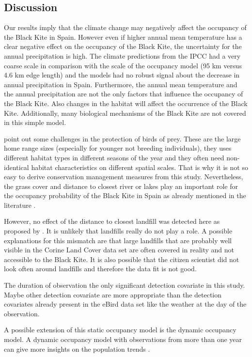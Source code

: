 \begin{multicols}{2}
\section{Discussion}
Our results imply that the climate change may negatively affect the occupancy of the Black Kite in Spain. However even if higher annual mean temperature has a clear negative effect on the occupancy of the Black Kite, the uncertainty for the annual precipitation is high. The climate predictions from the IPCC \parencite{ipcc} had a very coarse scale in comparison with the scale of the occupancy model (95 km versus 4.6 km edge length) and the models had no robust signal about the decrease in annual precipitation in Spain. Furthermore, the annual mean temperature and the annual precipitation are not the only factors that influence the occupancy of the Black Kite. Also changes in the habitat will affect the occurrence of the Black Kite. Additionally, many biological mechanisms of the Black Kite are not covered in this simple model.  

\textcite{Tanferna2013} point out some challenges in the protection of birds of prey. These are the large home range sizes (especially for younger not breeding individuals), they uses different habitat types in different seasons of the year and they often need non-identical habitat characteristics on different spatial scales. That is why it is not so easy to derive conservation management measures from this study. Nevertheless, the grass cover and distance to closest river or lakes play an important role for the occupancy probability of the Black Kite in Spain as already mentioned in the literature \parencite{Tanferna2013, Veiga1990}. 

However, no effect of the distance to closest landfill was detected here as proposed by \textcite{Blanco1997, Blanco1994}. It is unlikely that landfills really do not play a role. A possible explanations for this mismatch are that large landfills that are probably well visible in the Corine Land Cover data set \parencite{clc2018} are often covered in reality and not accessible to the Black Kite. It is also possible that the citizen scientist did not look often around landfills and therefore the data fit is not good. 

The duration of observation the only significant detection covariate in this study. Maybe other detection covariate are more appropriate than the detection covariates already present in the eBird data set like the weather at the day of the observation.

A possible extension of this static occupancy model is the dynamic occupancy model. A dynamic occupancy model with observations from more than one year can give more insights on the population trends \parencite{Green2019}. 


\end{multicols}